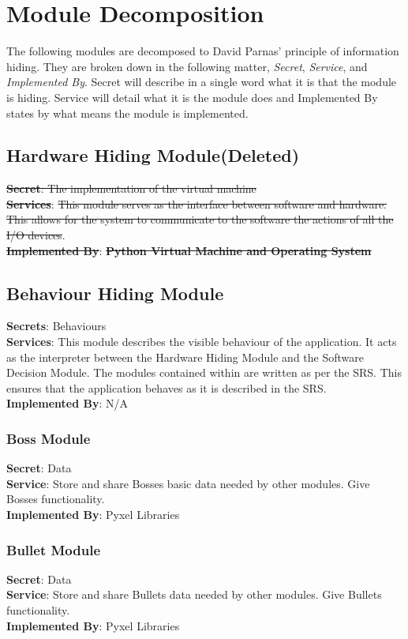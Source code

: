 \documentclass[12,english]{article}
\begin{document}
\section{Module Decomposition}

The following modules are decomposed to David Parnas' principle of information hiding. They are broken down in the following matter, \textit{Secret}, \textit{Service}, and \textit{Implemented By}. Secret will describe in a single word what it is that the module is hiding. Service will detail what it is the module does and Implemented By states by what means the module is implemented. \cite{b1}
	\subsection{Hardware Hiding Module(Deleted)}
	\textbf{\sout{Secret}}\sout{: The implementation of the virtual machine} \\
	\textbf{\sout{Services}}: \sout{This module serves as the interface between software and hardware. This allows for the system to communicate to the software the actions of all the I/O devices}. \cite{b1}\\
	\textbf{\sout{Implemented By}}: \textbf{\sout{Python Virtual Machine and Operating System}}
	
	\subsection{Behaviour Hiding Module}
	\textbf{Secrets}: Behaviours \\
	\textbf{Services}: This module describes the visible behaviour of the application. It acts as the interpreter between the Hardware Hiding Module and the Software Decision Module. The modules contained within are written as per the SRS. This ensures that the application behaves as it is described in the SRS. \cite{b1}\\
	\textbf{Implemented By}: N/A \\
	\subsubsection{Boss Module}
	\textbf{Secret}:  Data \\
	\textbf{Service}: Store and share Bosses basic data needed by other modules. Give Bosses functionality.\\  
	\textbf{Implemented By}: Pyxel Libraries \\
	\subsubsection{Bullet Module}
	\textbf{Secret}: Data\\
	\textbf{Service}: Store and share Bullets data needed by other modules. Give Bullets functionality. \\
	\textbf{Implemented By}: Pyxel Libraries\\
\end{document}
